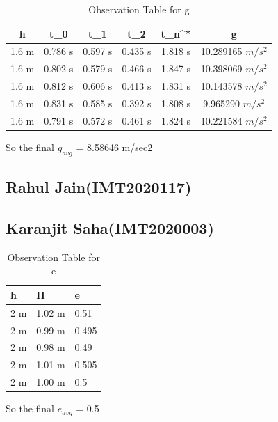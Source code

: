 \documentclass[11pt]{scrartcl} %
\begin{document}
\begin{table}[h]
\centering
\begin{tabular}{||c c c c c c||} 
\toprule
 \hline
 h & t_0 & t_1 & t_2 & t_n^* & g \\ [0.5ex] 
 \midrule
 \hline\hline
 1.6 m & 0.786 s & 0.597 s  & 0.435 s & 1.818 s & 10.289165 $m/s^2$ \\
 \hline
 1.6 m & 0.802 s & 0.579 s & 0.466 s & 1.847 s & 10.398069 $m/s^2$  \\
 \hline
 1.6 m & 0.812 s & 0.606 s & 0.413 s & 1.831 s  & 10.143578 $m/s^2$ \\
 \hline
 1.6 m & 0.831 s & 0.585 s & 0.392 s & 1.808 s  & 9.965290 $m/s^2$  \\
 \hline
 1.6 m & 0.791 s & 0.572 s & 0.461 s & 1.824 s  & 10.221584 $m/s^2$ \\ [1ex]
 \bottomrule
 \hline
\end{tabular}
\caption{Observation Table for g}
\end{table}
So the final $g_{avg}$ = 8.58646 m/sec2

\subsection{Rahul Jain(IMT2020117)}
\subsection{Karanjit Saha(IMT2020003)}
\begin{table}[h] %
	\centering %
	\begin{tabular}{l l l}
		\toprule
		\textbf{h} & \textbf{H} & \textbf{e} \\
		\midrule
		2 m & 1.02 m & 0.51\\
		2 m & 0.99 m  & 0.495\\
		2 m & 0.98 m  & 0.49\\
		2 m & 1.01 m & 0.505 \\
		2 m & 1.00 m & 0.5 \\
		\bottomrule
	\end{tabular}
	\caption{Observation Table for e}
\end{table}
So the final $e_{avg}$ = 0.5
\end{document}
